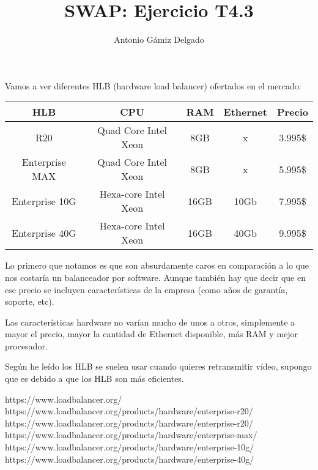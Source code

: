 \documentclass[12pt]{article}
\begin{document}
\title{SWAP: Ejercicio T4.3}
\author{
        Antonio Gámiz Delgado
}
\maketitle
\medskip

Vamos a ver diferentes HLB (hardware load balancer) ofertados en el mercado:

\medskip

\begin{tabular}{|c|c|c|c|c|}
\hline 
HLB & CPU & RAM & Ethernet & Precio \\ 
\hline 
R20 & Quad Core Intel Xeon & 8GB & x & 3.995\$ \\ 
\hline 
Enterprise MAX & Quad Core Intel Xeon & 8GB & x & 5.995\$ \\ 
\hline 
Enterprise 10G & Hexa-core Intel Xeon & 16GB & 10Gb & 7.995\$ \\ 
\hline 
Enterprise 40G & Hexa-core Intel Xeon & 16GB & 40Gb & 9.995\$ \\ 
\hline 
\end{tabular} 

\medskip

Lo primero que notamos es que son absurdamente caros en comparación a lo que nos costaría un balanceador por software. Aunque también hay que decir que en ese precio se incluyen características de la empresa (como años de garantía, soporte, etc). 

Las características hardware no varían mucho de unos a otros, simplemente a mayor el precio, mayor la cantidad de Ethernet disponible, más RAM y mejor procesador.

Según he leído los HLB se suelen usar cuando quieres retransmitir vídeo, supongo que es debido a que los HLB son más eficientes.

\begin{thebibliography}{9}
https://www.loadbalancer.org/
https://www.loadbalancer.org/products/hardware/enterprise-r20/
https://www.loadbalancer.org/products/hardware/enterprise-r20/
https://www.loadbalancer.org/products/hardware/enterprise-max/
https://www.loadbalancer.org/products/hardware/enterprise-10g/
https://www.loadbalancer.org/products/hardware/enterprise-40g/

\end{thebibliography}
\end{document}
